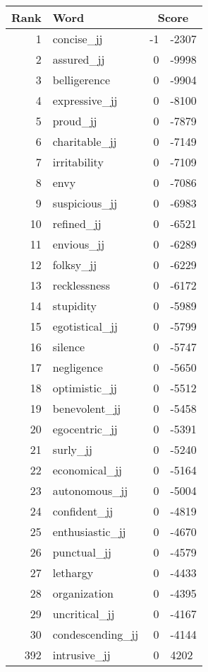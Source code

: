 \begin{longtable}[!htbp]{| rlr@{.}l |}
    \hline
    \textbf{Rank} & \textbf{Word} & \multicolumn{2}{c|}{\textbf{Score}} \\
    \hline
    \endhead
    1 & concise\_jj & -1 & -2307 \\
    2 & assured\_jj & 0 & -9998 \\
    3 & belligerence & 0 & -9904 \\
    4 & expressive\_jj & 0 & -8100 \\
    5 & proud\_jj & 0 & -7879 \\
    6 & charitable\_jj & 0 & -7149 \\
    7 & irritability & 0 & -7109 \\
    8 & envy & 0 & -7086 \\
    9 & suspicious\_jj & 0 & -6983 \\
    10 & refined\_jj & 0 & -6521 \\
    11 & envious\_jj & 0 & -6289 \\
    12 & folksy\_jj & 0 & -6229 \\
    13 & recklessness & 0 & -6172 \\
    14 & stupidity & 0 & -5989 \\
    15 & egotistical\_jj & 0 & -5799 \\
    16 & silence & 0 & -5747 \\
    17 & negligence & 0 & -5650 \\
    18 & optimistic\_jj & 0 & -5512 \\
    19 & benevolent\_jj & 0 & -5458 \\
    20 & egocentric\_jj & 0 & -5391 \\
    21 & surly\_jj & 0 & -5240 \\
    22 & economical\_jj & 0 & -5164 \\
    23 & autonomous\_jj & 0 & -5004 \\
    24 & confident\_jj & 0 & -4819 \\
    25 & enthusiastic\_jj & 0 & -4670 \\
    26 & punctual\_jj & 0 & -4579 \\
    27 & lethargy & 0 & -4433 \\
    28 & organization & 0 & -4395 \\
    29 & uncritical\_jj & 0 & -4167 \\
    30 & condescending\_jj & 0 & -4144 \\
    392 & intrusive\_jj & 0 & 4202 \\

\end{longtable}
